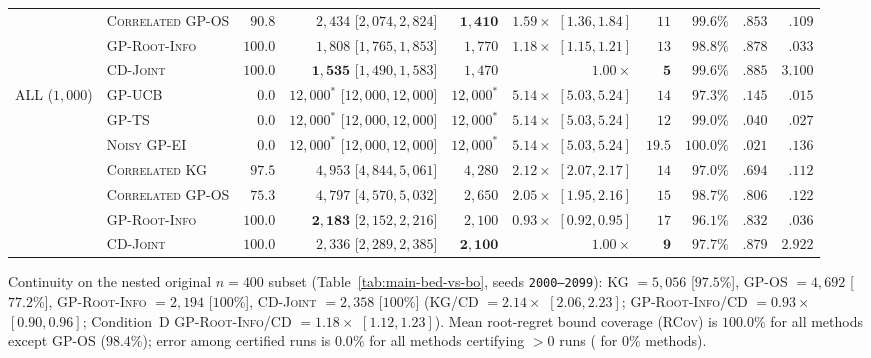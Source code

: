 \documentclass{article}
\theoremstyle{plain}
\theoremstyle{definition}
\begin{document}
\begin{table}[!htbp]
{\begin{tabular}{@{}llrrrrrrrr@{}}
 & \textsc{Correlated GP-OS} & $90.8$ & $2{,}434$ [$2{,}074,2{,}824$] & $\mathbf{1{,}410}$ & $1.59\times$ $[1.36,1.84]$ & $11$ & $99.6\%$ & $.853$ & $.109$ \\
 & \textsc{GP-Root-Info} & $\mathbf{100.0}$ & $1{,}808$ [$1{,}765,1{,}853$] & $1{,}770$ & $1.18\times$ $[1.15,1.21]$ & $13$ & $98.8\%$ & $.878$ & $.033$ \\
 & \textsc{CD-Joint} & $\mathbf{100.0}$ & $\mathbf{1{,}535}$ [$1{,}490,1{,}583$] & $1{,}470$ & $1.00\times$ & $\mathbf{5}$ & $99.6\%$ & $.885$ & $3.100$ \\
\midrule
\multirow{7}{*}{ALL ($1{,}000$)}
 & \textsc{GP-UCB} & $0.0$ & $12{,}000^*$ [$12{,}000,12{,}000$] & $12{,}000^*$ & $5.14\times$ $[5.03,5.24]$ & $14$ & $97.3\%$ & $.145$ & $.015$ \\
 & \textsc{GP-TS} & $0.0$ & $12{,}000^*$ [$12{,}000,12{,}000$] & $12{,}000^*$ & $5.14\times$ $[5.03,5.24]$ & $12$ & $99.0\%$ & $.040$ & $.027$ \\
 & \textsc{Noisy GP-EI} & $0.0$ & $12{,}000^*$ [$12{,}000,12{,}000$] & $12{,}000^*$ & $5.14\times$ $[5.03,5.24]$ & $19.5$ & $100.0\%$ & $.021$ & $.136$ \\
 & \textsc{Correlated KG} & $97.5$ & $4{,}953$ [$4{,}844,5{,}061$] & $4{,}280$ & $2.12\times$ $[2.07,2.17]$ & $14$ & $97.0\%$ & $.694$ & $.112$ \\
 & \textsc{Correlated GP-OS} & $75.3$ & $4{,}797$ [$4{,}570,5{,}032$] & $2{,}650$ & $2.05\times$ $[1.95,2.16]$ & $15$ & $98.7\%$ & $.806$ & $.122$ \\
 & \textsc{GP-Root-Info} & $\mathbf{100.0}$ & $\mathbf{2{,}183}$ [$2{,}152,2{,}216$] & $2{,}100$ & $0.93\times$ $[0.92,0.95]$ & $17$ & $96.1\%$ & $.832$ & $.036$ \\
 & \textsc{CD-Joint} & $\mathbf{100.0}$ & $2{,}336$ [$2{,}289,2{,}385$] & $\mathbf{2{,}100}$ & $1.00\times$ & $\mathbf{9}$ & $97.7\%$ & $.879$ & $2.922$ \\
\bottomrule
\end{tabular}%
}
\par\vspace{2pt}\noindent
\parbox{\linewidth}{\scriptsize Continuity on the nested original $n=400$ subset (Table~\ref{tab:main-bed-vs-bo}, seeds \texttt{2000--2099}): \textsc{KG} $=5{,}056$ [$97.5\%$], \textsc{GP-OS} $=4{,}692$ [$77.2\%$], \textsc{GP-Root-Info} $=2{,}194$ [$100\%$], \textsc{CD-Joint} $=2{,}358$ [$100\%$] (\textsc{KG/CD} $=2.14\times$ $[2.06,2.23]$; \textsc{GP-Root-Info/CD} $=0.93\times$ $[0.90,0.96]$; Condition~D \textsc{GP-Root-Info/CD} $=1.18\times$ $[1.12,1.23]$). Mean root-regret bound coverage (\textsc{RCov}) is $100.0\%$ for all methods except \textsc{GP-OS} ($98.4\%$); error among certified runs is $0.0\%$ for all methods certifying $>0$ runs (\text{---} for $0\%$ methods).}
\end{table}
\end{document}

